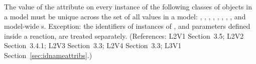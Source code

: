 The value of the  attribute on every instance of the
following classes of objects in a model must be unique
across the set of all  values in a model: \Model,
\FunctionDefinition, 
\Compartment, \Species, \Reaction, \SpeciesReference,
\ModifierSpeciesReference, \Event, and model-wide \Parameter{}s.
Exception: the identifiers of instances of \UnitDefinition, and parameters defined
inside a reaction, are treated separately.  (References: L2V1
Section~3.5; L2V2 Section~3.4.1; L2V3 Section~3.3; L2V4 Section~3.3; L3V1 
Section~\ref{sec:idnameattribs}.)

